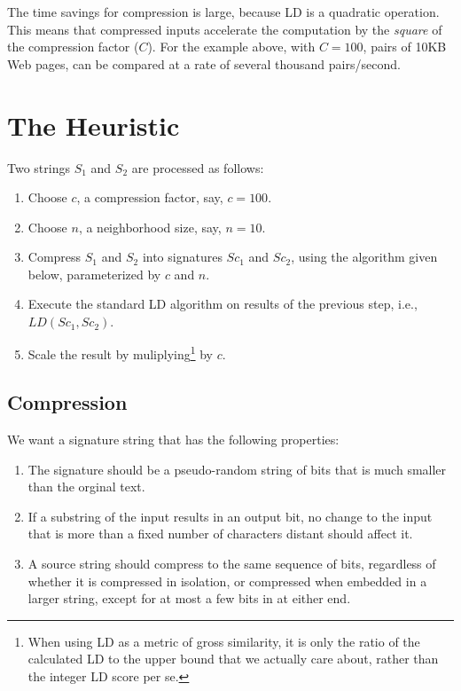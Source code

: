 \documentclass[html]{article}    %
\begin{document}
The time savings for compression is large, because LD is a quadratic operation.  
This means that compressed inputs accelerate the computation by the {\em square}
of the compression factor ($C$).
For the example above, with $C=100$, pairs of 10KB Web pages, can be compared 
at a rate of several thousand pairs/second.

\section{The Heuristic}
Two strings $S_{1}$ and $S_{2}$ are processed as follows:

\begin{enumerate}
  	\item {Choose $c$, a compression factor, say, $c=100$.}
  	\item {Choose $n$, a neighborhood size, say, $n=10$.}
	\item {Compress $S_{1}$ and $S_{2}$ into signatures $Sc_{1}$ and $Sc_{2}$,
		using the algorithm given below, parameterized by $c$ and $n$.}
	\item {Execute the standard LD algorithm on results of the previous step, i.e.,
			$LD(Sc_{1},Sc_{2})$.}
	\item {Scale the result by muliplying\footnote{
		When using LD as a metric of gross similarity, it is only the
		ratio of the calculated LD to the upper bound that we actually care 
		about, rather than the integer LD score per se. 
		} by $c$. }
\end{enumerate}

\subsection{Compression}
We want a signature string that has the following properties:
\begin{enumerate}
	\item {
		The signature should be a pseudo-random string of bits that is much smaller
		than the orginal text.
	}
	\item{
		If a substring of the input results in an output bit, no change to the
		input that is more than a fixed number of characters distant should affect
		it. 
	}
	\item{
		A source string should compress to the same sequence of bits,
		regardless of whether it is compressed in isolation, or compressed when 
		embedded in a larger string, except for at most a few bits
		in at either end.
		}
\end{enumerate}
\end{document}
